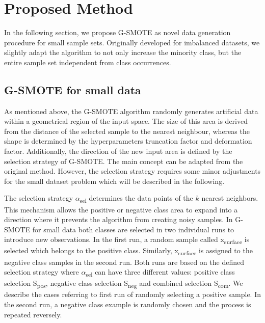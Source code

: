 \documentclass[parskip=full]{scrartcl}
\begin{document}
\section{Proposed Method}

In the following section, we propose G-SMOTE as novel data generation procedure for small sample sets. Originally developed for imbalanced datasets, we slightly adapt the algorithm to not only increase the minority class, but the entire sample set independent from class occurrences. 

\subsection{G-SMOTE for small data}

As mentioned above, the G-SMOTE algorithm randomly generates artificial data within a geometrical region of the input space. The size of this area is derived from the distance of the selected sample to the nearest neighbour, whereas the shape is determined by the hyperparameters truncation factor and deformation factor. Additionally, the direction of the new input area is defined by the selection strategy of G-SMOTE. The main concept can be adapted from the original method. However, the selection strategy requires some minor adjustments for the small dataset problem which will be described in the following.

The selection strategy $\alpha$\textsubscript{sel} determines the data points of the $\mathit{k}$ nearest neighbors. This mechanism allows the positive or negative class area to expand into a direction where it prevents the algorithm from creating noisy samples. In G-SMOTE for small data both classes are selected in two individual runs to introduce new observations. In the first run, a random sample called x\textsubscript{surface} is selected which belongs to the positive class. Similarly, x\textsubscript{surface} is assigned to the negative class samples in the second run. Both runs are based on the defined selection strategy where $\alpha$\textsubscript{sel} can have three different values: positive class selection S\textsubscript{pos}, negative class selection S\textsubscript{neg} and combined selection S\textsubscript{com}. We describe the cases referring to first run of randomly selecting a positive sample. In the second run, a negative class example is randomly chosen and the process is repeated reversely. 
\end{document}
